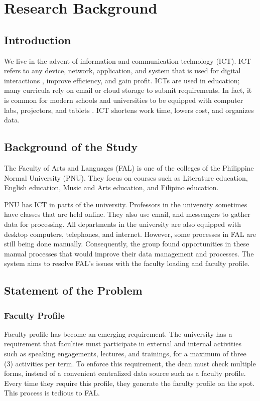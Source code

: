 \chapter{Research Background}

\section{Introduction}
We live in the advent of information and communication technology (ICT). ICT refers to any device, network, application, and system that is used for digital interactions \cite{ref:WhatAreICTs}, improve efficiency, and gain profit. ICTs are used in education; many curricula rely on email or cloud storage to submit requirements. In fact, it is common for modern schools and universities to be equipped with computer labs, projectors, and tablets \cite{ref:ICTinEducation}. ICT shortens work time, lowers cost, and organizes data. 

\section{Background of the Study}
The Faculty of Arts and Languages (FAL) is one of the colleges of the Philippine Normal University (PNU). They focus on courses such as Literature education, English education, Music and Arts education, and Filipino education. 

PNU has ICT in parts of the university. Professors in the university sometimes have classes that are held online. They also use email, and messengers to gather data for processing. All departments in the university are also equipped with desktop computers, telephones, and internet. However, some processes in FAL are still being done manually. Consequently, the group found opportunities in these manual processes that would improve their data management and processes. The system aims to resolve FAL's issues with the faculty loading and faculty profile.

\section{Statement of the Problem}

\subsection{Faculty Profile}
Faculty profile has become an emerging requirement. The university has a requirement that faculties must participate in external and internal activities such as speaking engagements, lectures, and trainings, for a maximum of three (3) activities per term. To enforce this requirement, the dean must check multiple forms, instead of a convenient centralized data source such as a faculty profile. Every time they require this profile, they generate the faculty profile on the spot. This process is tedious to FAL.

